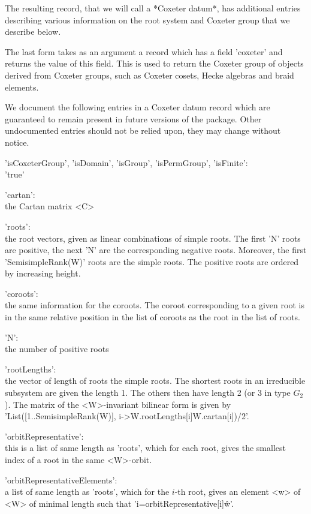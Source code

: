 The  resulting record, that we will  call a *Coxeter datum*, has additional
entries describing various information on the root system and Coxeter group
that we describe below.

The last form takes as an argument a record which has a field 'coxeter' and
returns  the value of this field. This  is used to return the Coxeter group
of  objects  derived  from  Coxeter  groups,  such as Coxeter cosets, Hecke
algebras and braid elements.

We  document  the  following  entries  in  a Coxeter datum record which are
guaranteed  to  remain  present  in  future  versions of the package. Other
undocumented  entries should  not be  relied upon,  they may change without
notice.

'isCoxeterGroup', 'isDomain', 'isGroup', 'isPermGroup', 'isFinite':\\
        'true'

'cartan':\\ the Cartan matrix <C>

'roots':\\ the root vectors, given  as linear combinations of simple roots.
       The first 'N' roots are positive, the next 'N' are the corresponding
       negative  roots. Moreover,  the first  'SemisimpleRank(W)' roots are
       the  simple  roots.  The  positive  roots  are ordered by increasing
       height.

'coroots':\\   the same   information    for  the  coroots.    The coroot
       corresponding  to a given  root is in  the same relative position in
       the list of coroots as the root in the list of roots.

'N':\\ the number of positive roots

'rootLengths':\\ the vector of length of roots the simple roots.
       The  shortest roots in an irreducible subsystem are given the length
       1. The others then have length 2 (or 3 in type $G_2$). The matrix of
       the <W>-invariant bilinear form is given by
       'List([1..SemisimpleRank(W)], i->W.rootLengths[i]\*W.cartan[i])/2'.

'orbitRepresentative':\\ this is a list of  same length as 'roots', which
       for  each  root,  gives  the  smallest  index  of a root in the same
       <W>-orbit.

'orbitRepresentativeElements':\\ a list of  same length as 'roots', which
       for  the $i$-th root, gives an element  <w> of <W> of minimal length
       such that 'i=orbitRepresentative[i]\^w'.

